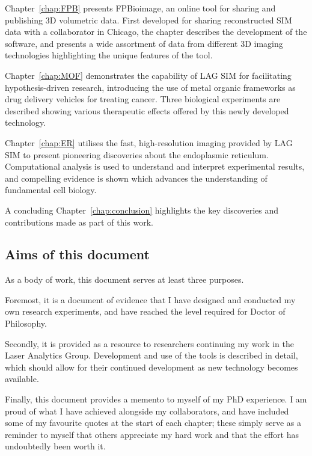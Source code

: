 Chapter~\ref{chap:FPB} presents FPBioimage, an online tool for sharing and publishing 3D volumetric data. 
First developed for sharing reconstructed SIM data with a collaborator in Chicago, the chapter describes the development of the software, and presents a wide assortment of data from different 3D imaging technologies highlighting the unique features of the tool. 

Chapter~\ref{chap:MOF} demonstrates the capability of LAG SIM for facilitating hypothesis-driven research, introducing the use of metal organic frameworks as drug delivery vehicles for treating cancer. 
Three biological experiments are described showing various therapeutic effects offered by this newly developed technology. 

Chapter~\ref{chap:ER} utilises the fast, high-resolution imaging provided by LAG SIM to present pioneering discoveries about the endoplasmic reticulum. 
Computational analysis is used to understand and interpret experimental results, and compelling evidence is shown which advances the understanding of fundamental cell biology. 

A concluding Chapter~\ref{chap:conclusion} highlights the key discoveries and contributions made as part of this work.

\subsection{Aims of this document}
As a body of work, this document serves at least three purposes. 

Foremost, it is a document of evidence that I have designed and conducted my own research experiments, and have reached the level required for Doctor of Philosophy. 

Secondly, it is provided as a resource to researchers continuing my work in the Laser Analytics Group. 
Development and use of the tools is described in detail, which should allow for their continued development as new technology becomes available. 

Finally, this document provides a memento to myself of my PhD experience. 
I am proud of what I have achieved alongside my collaborators, and have included some of my favourite quotes at the start of each chapter; these simply serve as a reminder to myself that others appreciate my hard work and that the effort has undoubtedly been worth it. 


